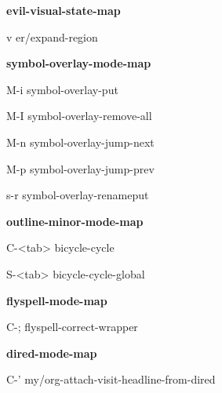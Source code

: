 \documentclass[10pt]{article}
\renewcommand\subsection[1]{\smallskip\par\textbf{\color{heading}#1}}
\begin{document}
\begin{multicols}{4}
  \subsection{evil-visual-state-map}
  \begin{keylist}
    \item[v] er/expand-region
  \end{keylist}
  \subsection{symbol-overlay-mode-map}
  \begin{keylist}
    \item[M-i] symbol-overlay-put
    \item[M-I] symbol-overlay-remove-all
    \item[M-n] symbol-overlay-jump-next
    \item[M-p] symbol-overlay-jump-prev
    \item[s-r] symbol-overlay-renameput
  \end{keylist}

  \subsection{outline-minor-mode-map}
  \begin{keylist}
    \item[C-<tab>] bicycle-cycle
    \item[S-<tab>] bicycle-cycle-global
  \end{keylist}

  \subsection{flyspell-mode-map}
  \begin{keylist}
    \item[C-;] flyspell-correct-wrapper
  \end{keylist}

  \subsection{dired-mode-map}
  \begin{keylist}
    \item[C-'] my/org-attach-visit-headline-from-dired
  \end{keylist}


\end{multicols}
\end{document}
